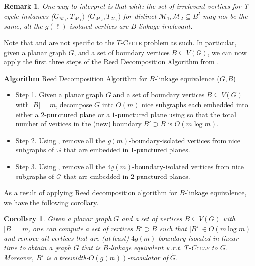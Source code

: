 \documentclass{article}
\newtheorem{corollary}[theorem]{Corollary}
\newtheorem{remark}[theorem]{Remark}
\numberwithin{claimcounter}{lemma}
\newcommand{\tcycle}{$T$-\textsc{Cycle}\xspace}
\begin{document}
\begin{remark}
    One way to interpret  is that while the set of irrelevant vertices for  T-cycle instances ($G_{\mathcal{M}_1},T_{\mathcal{M}_1})$  ($G_{\mathcal{M}_2},T_{\mathcal{M}_2})$ for distinct $\mathcal{M}_1,\mathcal{M}_2 \subseteq B^2$  may not be the same, all the  $g(\ell)$-isolated vertices are  $B$-linkage irrelevant.
\end{remark}

Note that  and  are not specific to the \tcycle problem as such. In particular,  given a planar graph $G$,  and a set of boundary vertices $B\subseteq V(G)$, we can now apply the first three steps of the {\sc Reed Decomposition Algorithm} from . 


\noindent
{\bf Algorithm} {\sc Reed Decomposition Algorithm for $B$-linkage equivalence} ($G,B$)
\begin{itemize}
\item Step 1. Given a planar graph $G$ and a set of boundary vertices $B\subseteq V(G)$ with $|B|=m $, decompose $G$ into $O(m)$ nice subgraphs each embedded into either a $2$-punctured  plane or a $1$-punctured plane using  so that the total number of  vertices in the (new) boundary $B' \supset B$ is $O(m \log m)$. 
\item Step 2. Using , remove all the $g(m)$-boundary-isolated vertices from nice subgraphs of G that are embedded in $1$-punctured planes.
\item Step 3. Using , remove all the $4 g(m)$-boundary-isolated vertices from nice subgraphs of $G$ that are embedded in $2$-punctured planes.
\end{itemize}


As a result of applying {\sc Reed decomposition algorithm for $B$-linkage equivalence}, we have the following corollary.

\begin{corollary} \label{C:twrednsubprot}
    Given a planar graph $G$ and a set of
    vertices $B\subseteq V(G)$ with $|B|=m $, one can compute a set of  vertices $B' \supset B$ such that $|B'| \in O(m \log m)$ and remove all vertices that are (at least) $4 g(m)$-boundary-isolated  in linear time to obtain a graph $\tilde{G}$ that is $B$-linkage equivalent w.r.t. \tcycle to $G$. Moreover, $B'$ is a treewidth-$O(g(m))$-modulator of $\tilde{G}$. 
\end{corollary}
\end{document}
